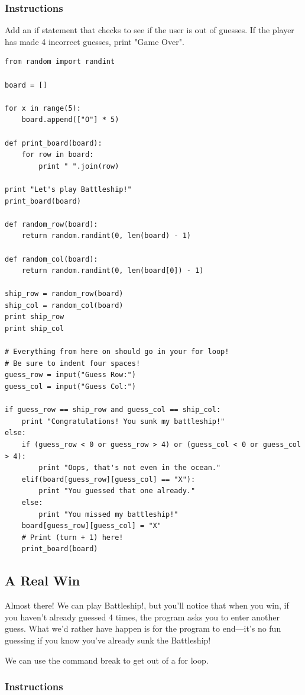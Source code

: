 \documentclass[12pt,a4paper,final,twoside,onecolumn,titlepage]{book}
\begin{document}
\subsubsection{Instructions}

Add an if statement that checks to see if the user is out of guesses. If the player has made 4 incorrect guesses, print "Game Over".
\begin{lstlisting}
from random import randint

board = []

for x in range(5):
    board.append(["O"] * 5)

def print_board(board):
    for row in board:
        print " ".join(row)

print "Let's play Battleship!"
print_board(board)

def random_row(board):
    return random.randint(0, len(board) - 1)

def random_col(board):
    return random.randint(0, len(board[0]) - 1)

ship_row = random_row(board)
ship_col = random_col(board)
print ship_row
print ship_col

# Everything from here on should go in your for loop!
# Be sure to indent four spaces!
guess_row = input("Guess Row:")
guess_col = input("Guess Col:")

if guess_row == ship_row and guess_col == ship_col:
    print "Congratulations! You sunk my battleship!"
else:
    if (guess_row < 0 or guess_row > 4) or (guess_col < 0 or guess_col > 4):
        print "Oops, that's not even in the ocean."
    elif(board[guess_row][guess_col] == "X"):
        print "You guessed that one already."
    else:
        print "You missed my battleship!"
    board[guess_row][guess_col] = "X"
    # Print (turn + 1) here!
    print_board(board)
\end{lstlisting}

\subsection{A Real Win}

Almost there! We can play Battleship!, but you’ll notice that when you win, if you haven’t already guessed 4 times, the program asks you to enter another guess. What we’d rather have happen is for the program to end—it’s no fun guessing if you know you’ve already sunk the Battleship!

We can use the command break to get out of a for loop.
\subsubsection{Instructions}
\end{document}
